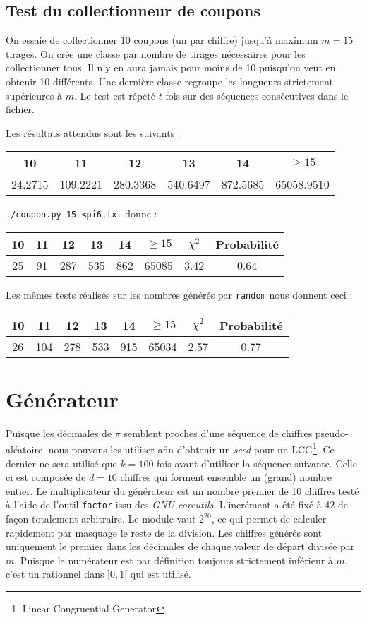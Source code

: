 \documentclass[12pt,a4paper]{article}
\begin{document}
\subsection{Test du collectionneur de coupons}
On essaie de collectionner 10 coupons (un par chiffre)
jusqu'à maximum $m=15$ tirages.
On crée une classe par nombre de tirages nécessaires pour les collectionner tous.
Il n'y en aura jamais pour moins de 10 puisqu'on veut en obtenir 10 différents.
Une dernière classe regroupe les longueurs strictement supérieures à $m$.
Le test est répété $t$ fois sur des séquences consécutives dans le fichier.

Les résultats attendus sont les suivants :
\begin{center}
\begin{tabular}{c|c|c|c|c|c}
10 & 11 & 12 & 13 & 14 & $\geq 15$ \\ \hline
24.2715 & 109.2221 & 280.3368 & 540.6497 & 872.5685 & 65058.9510
\end{tabular}
\end{center}

\texttt{./coupon.py 15 <pi6.txt} donne :
\begin{center}
\begin{tabular}{c|c|c|c|c|c|c|c}
10 & 11 & 12 & 13 & 14 & $\geq 15$ & $\chi^2$ & Probabilité \\ \hline
25 & 91 & 287 & 535 & 862 & 65085 &  3.42 &  0.64
\end{tabular}
\end{center}

Les mêmes tests réalisés sur les nombres générés par \texttt{random}
nous donnent ceci :
\begin{center}
\begin{tabular}{c|c|c|c|c|c|c|c}
10 & 11 & 12 & 13 & 14 & $\geq 15$ & $\chi^2$ & Probabilité \\ \hline
26 & 104 & 278 & 533 & 915 & 65034 &  2.57 &  0.77
\end{tabular}
\end{center}

\section{Générateur}
Puisque les décimales de $\pi$ semblent proches d'une séquence de chiffres
pseudo-aléatoire, nous pouvons les utiliser afin d'obtenir un \textit{seed}
pour un LCG\footnote{Linear Congruential Generator}. Ce dernier ne sera utilisé
que $k=100$ fois avant d'utiliser la séquence suivante. Celle-ci est composée de
$d=10$ chiffres qui forment ensemble un (grand) nombre entier.
Le multiplicateur du générateur est un nombre premier de 10 chiffres testé
à l'aide de l'outil \texttt{factor} issu des \textit{GNU coreutils}.
L'incrément a été fixé à 42 de façon totalement arbitraire.
Le module vaut $2^{20}$, ce qui permet de calculer rapidement par masquage
le reste de la division.
Les chiffres générés sont uniquement le premier dans les décimales de chaque
valeur de départ divisée par $m$.
Puisque le numérateur est par définition toujours strictement inférieur à $m$,
c'est un rationnel dans $]0,1[$ qui est utilisé.
\end{document}
